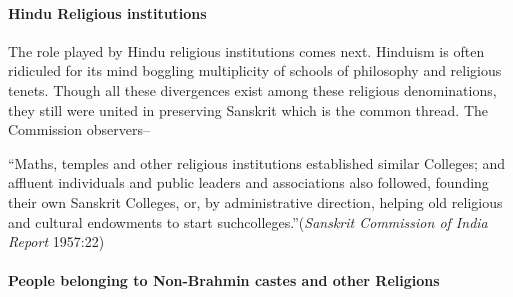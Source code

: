 \paragraph{Hindu Religious institutions}

The role played by Hindu religious institutions comes next. Hinduism is often ridiculed for its mind boggling multiplicity of schools of philosophy and religious tenets. Though all these divergences exist among these religious denominations, they still were united in preserving Sanskrit which is the common thread. The Commission observers–
\begin{myquote}
\eleven
“Maths, temples and other religious institutions established similar Colleges; and affluent individuals and public leaders and associations also followed, founding their own Sanskrit Colleges, or, by administrative direction, helping old religious and cultural endowments to start such\break colleges.”\hfill({\sl Sanskrit Commission of India Report} 1957:22)
\end{myquote}


\paragraph{People belonging to Non-Brahmin castes and other Religions}

